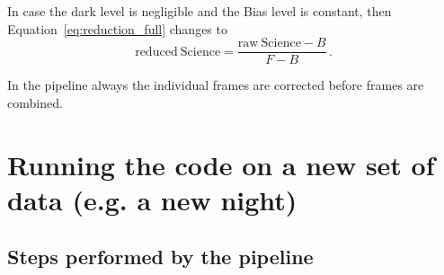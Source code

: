 \documentclass[10pt,a4paper]{article}
\begin{document}
In case the dark level is negligible and the Bias level is constant, then Equation~\ref{eq:reduction_full} changes to
\begin{equation}
  \mathrm{reduced\ Science} = \frac{\mathrm{raw\ Science} - B}{F - B}\,.
\end{equation}


In the pipeline always the individual frames are corrected before frames are combined.


\newpage
\section{Running the code on a new set of data (e.g. a new night)}


\subsection{Steps performed by the pipeline}
\label{Section:pipeline_steps_general}
\end{document}
